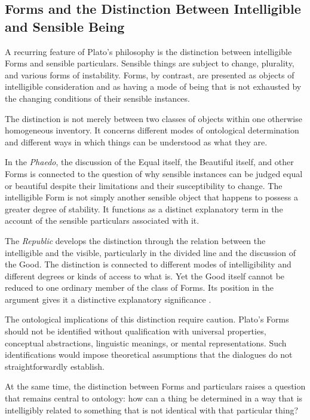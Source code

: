 \subsection{Forms and the Distinction Between Intelligible and Sensible Being}

A recurring feature of Plato's philosophy is the distinction between
intelligible Forms and sensible particulars. Sensible things are subject
to change, plurality, and various forms of instability. Forms, by
contrast, are presented as objects of intelligible consideration and as
having a mode of being that is not exhausted by the changing conditions
of their sensible instances.

The distinction is not merely between two classes of objects within one
otherwise homogeneous inventory. It concerns different modes of
ontological determination and different ways in which things can be
understood as what they are.

In the \textit{Phaedo}, the discussion of the Equal itself, the Beautiful
itself, and other Forms is connected to the question of why sensible
instances can be judged equal or beautiful despite their limitations and
their susceptibility to change. The intelligible Form is not simply
another sensible object that happens to possess a greater degree of
stability. It functions as a distinct explanatory term in the account of
the sensible particulars associated with it.

The \textit{Republic} develops the distinction through the relation
between the intelligible and the visible, particularly in the divided
line and the discussion of the Good. The distinction is connected to
different modes of intelligibility and different degrees or kinds of
access to what is. Yet the Good itself cannot be reduced to one ordinary
member of the class of Forms. Its position in the argument gives it a
distinctive explanatory significance \citep{PlatoSophist}.

The ontological implications of this distinction require caution.
Plato's Forms should not be identified without qualification with
universal properties, conceptual abstractions, linguistic meanings, or
mental representations. Such identifications would impose theoretical
assumptions that the dialogues do not straightforwardly establish.

At the same time, the distinction between Forms and particulars raises
a question that remains central to ontology: how can a thing be
determined in a way that is intelligibly related to something that is
not identical with that particular thing?

